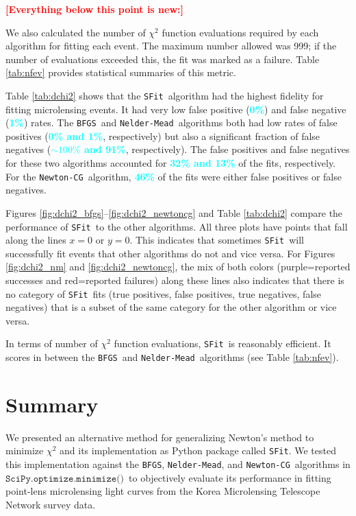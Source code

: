 \documentclass[preprint]{aastex631}
\newcommand{\HL}[1]{\textcolor{red}{\bf#1}}
\newcommand{\num}[1]{\textcolor{cyan}{\bf#1}}
\newcommand{\minimize}{$\texttt{SciPy.optimize.minimize()}$}
\newcommand{\neldermead}{\texttt{Nelder-Mead}}
\newcommand{\newtoncg}{\texttt{Newton-CG}}
\newcommand{\bfgs}{\texttt{BFGS}}
\newcommand{\sfit}{\texttt{SFit}}
\begin{document}
\HL{[Everything below this point is new:]}

We also calculated the number of $\chi^2$ function evaluations required by each algorithm for fitting each event. The maximum  number allowed was 999; if the number of evaluations exceeded this, the fit was marked as a failure. Table \ref{tab:nfev} provides statistical summaries of this metric.

Table \ref{tab:dchi2} shows that the \sfit\, algorithm had the highest fidelity for fitting microlensing events. It had very low false positive (\num{0\%}) and false negative (\num{1\%}) rates. The \bfgs\, and \neldermead\, algorithms both had low rates of false positives (\num{0\% and 1\%}, respectively) but also a significant fraction of false negatives (\num{$\sim 100\%$ and 91\%}, respectively). The false positives and false negatives for these two algorithms accounted for \num{32\% and 13\%} of the fits, respectively. For the \newtoncg\, algorithm, \num{46\%} of the fits were either false positives or false negatives. 

Figures \ref{fig:dchi2_bfgs}--\ref{fig:dchi2_newtoncg} and Table \ref{tab:dchi2} compare the performance of \sfit\, to the other algorithms. All three plots have points that fall along the lines $x=0$ or $y=0$. This indicates that sometimes \sfit\, will successfully fit events that other algorithms do not and vice versa. For Figures \ref{fig:dchi2_nm} and \ref{fig:dchi2_newtoncg}, the mix of both colors (purple=reported successes and red=reported failures) along these lines also indicates that there is no category of \sfit\, fits (true positives, false positives, true negatives, false negatives) that is a subset of the same category for the other algorithm or vice versa. 

In terms of number of $\chi^2$ function evaluations, \sfit\, is reasonably efficient. It scores in between the \bfgs\, and \neldermead\, algorithms (see Table \ref{tab:nfev}).

{\section{Summary}
\label{sec:summary}}

We presented an alternative method for generalizing Newton's method to minimize $\chi^2$ and its implementation as Python package called \sfit. We tested this implementation against the \bfgs, \neldermead, and \newtoncg\, algorithms in \minimize\, to objectively evaluate its performance in fitting point-lens microlensing light curves from the Korea Microlensing Telescope Network survey data. 
\end{document}
